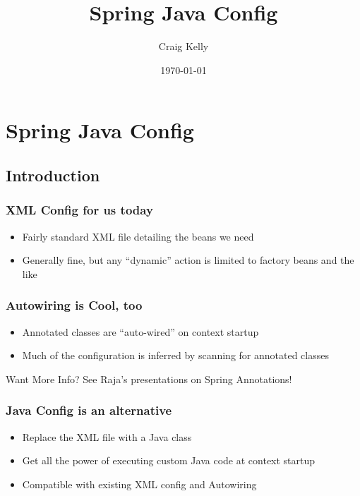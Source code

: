 \documentclass[t,handout]{beamer}
\title{Spring Java Config}
\author{Craig Kelly}
\date{\today}
\begin{document}
\frame{\titlepage}

\section{Spring Java Config}

    \subsection{Introduction}
        \frame
        {
          \frametitle{XML Config for us today}
          \begin{itemize}
          \item Fairly standard XML file detailing the beans we need
          \item Generally fine, but any ``dynamic'' action is limited to
                factory beans and the like
          \end{itemize}
          {\tiny
            
          }
        }

        \frame
        {
            \frametitle{Autowiring is Cool, too}
            \begin{itemize}
                \item Annotated classes are ``auto-wired'' on context startup
                \item Much of the configuration is inferred by scanning for annotated classes
            \end{itemize}
            \begin{block}{Want More Info?}
                See Raja's presentations on Spring Annotations!
            \end{block}
        }

        \frame
        {
          \frametitle{Java Config is an alternative}
          \begin{itemize}
          \item Replace the XML file with a Java class
          \item Get all the power of executing custom Java code at context startup
          \item Compatible with existing XML config and Autowiring
          \end{itemize}
          {\tiny
            
          }
        }
\end{document}
